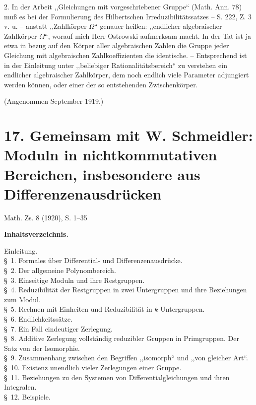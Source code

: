 \documentclass[11pt]{article}
\begin{document}
2. In der Arbeit ,,Gleichungen mit vorgeschriebener Gruppe`` (Math. Ann. 78) muß es bei der Formulierung des Hilbertschen Irreduzibilitätssatzes -- S. 222, Z. 3 v. u. -- anstatt ,,Zahlkörper $\Omega$`` genauer heißen: ,,endlicher algebraischer Zahlkörper $\Omega$``, worauf mich Herr Ostrowski aufmerksam macht. In der Tat ist ja etwa in bezug auf den Körper aller algebraischen Zahlen die Gruppe jeder Gleichung mit algebraischen Zahlkoeffizienten die identische. -- Entsprechend ist in der Einleitung unter ,,beliebiger Rationalitätsbereich`` zu verstehen ein endlicher algebraischer Zahlkörper, dem noch endlich viele Parameter adjungiert werden können, oder einer der so entstehenden Zwischenkörper.

\begin{center}
(Angenommen September 1919.)
\end{center}

\clearpage
\setcounter{footnote}{0}
\section*{17. Gemeinsam mit W. Schmeidler: Moduln in nichtkommutativen Bereichen, insbesondere aus Differenzenausdrücken}
\begin{center}
Math. Zs. 8 (1920), S. 1--35
\end{center}

\begin{center}
\textbf{Inhaltsverzeichnis.}
\end{center}
\begin{center}
\begin{minipage}{0.82\linewidth}
Einleitung.\\
\S~1. Formales über Differential- und Differenzenausdrücke.\\
\S~2. Der allgemeine Polynombereich.\\
\S~3. Einseitige Moduln und ihre Restgruppen.\\
\S~4. Reduzibilität der Restgruppen in zwei Untergruppen und ihre Beziehungen zum Modul.\\
\S~5. Rechnen mit Einheiten und Reduzibilität in $k$ Untergruppen.\\
\S~6. Endlichkeitssätze.\\
\S~7. Ein Fall eindeutiger Zerlegung.\\
\S~8. Additive Zerlegung vollständig reduzibler Gruppen in Primgruppen. Der Satz von der Isomorphie.\\
\S~9. Zusammenhang zwischen den Begriffen ,,isomorph`` und ,,von gleicher Art``.\\
\S~10. Existenz unendlich vieler Zerlegungen einer Gruppe.\\
\S~11. Beziehungen zu den Systemen von Differentialgleichungen und ihren Integralen.\\
\S~12. Beispiele.
\end{minipage}
\end{center}
\end{document}
